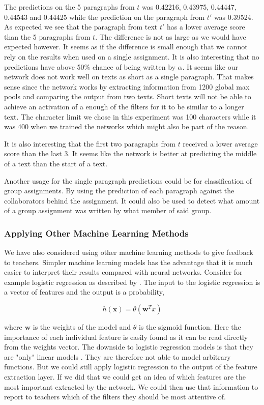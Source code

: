 The predictions on the 5 paragraphs from $t$ was 0.42216, 0.43975, 0.44447,
0.44543 and 0.44425 while the prediction on the paragraph from $t'$ was 0.39524.
As expected we see that the paragraph from text $t'$ has a lower average score
than the 5 paragraphs from $t$. The difference is not as large as we would
have expected however. It seems as if the difference is small enough that
we cannot rely on the results when used on a single assignment. It is also
interesting that no predictions have above 50\% chance of being written by
$\alpha$. It seems like our network does not work well on texts as short as
a single paragraph. That makes sense since the network works by extracting
information from 1200 global max pools and comparing the output from two texts.
Short texts will not be able to achieve an activation of a enough of the filters
for it to be similar to a longer text. The character limit we chose in this
experiment was 100 characters while it was 400 when we trained the networks
which might also be part of the reason.

It is also interesting that the first two paragraphs from $t$ received a lower
average score than the last 3. It seems like the network is better at predicting
the middle of a text than the start of a text.

Another usage for the single paragraph predictions could be for classification
of group assignments. By using the prediction of each paragraph against the
collaborators behind the assignment. It could also be used to detect what amount
of a group assignment was written by what member of said group.


\subsubsection{Applying Other Machine Learning Methods}

We have also considered using other machine learning methods to give feedback
to teachers. Simpler machine learning models has the advantage that it is much
easier to interpret their results compared with neural networks. Consider for
example logistic regression as described by \citet{Abu-Mostafa:2012:LD:2207825}.
The input to the logistic regression is a vector of features and the output is a
probability,

\begin{equation}
    h(\mathbf{x}) = \theta(\mathbf{w}^Tx)
\end{equation}

where $\mathbf{w}$ is the weights of the model and $\theta$ is the sigmoid
function. Here the importance of each individual feature is easily
found as it can be read directly from the weights vector. The downside
to logistic regression models is that they are "only" linear models
\citep{Abu-Mostafa:2012:LD:2207825}. They are therefore not able to model
arbitrary functions. But we could still apply logistic regression to the output
of the feature extraction layer. If we did that we could get an idea of which
features are the most important extracted by the network. We could then use
that information to report to teachers which of the filters they should be most
attentive of.

